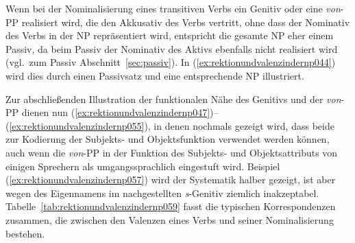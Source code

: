 Wenn bei der Nominalisierung eines transitiven Verbs ein Genitiv oder eine \textit{von}-PP realisiert wird, die den Akkusativ des Verbs vertritt, ohne dass der Nominativ des Verbs in der NP repräsentiert wird, entspricht die gesamte NP eher einem Passiv, da beim Passiv der Nominativ des Aktivs ebenfalls nicht realisiert wird (vgl.\ zum Passiv Abschnitt~\ref{sec:passiv}).
In (\ref{ex:rektionundvalenzindernp044}) wird dies durch einen Passivsatz und eine entsprechende NP illustriert.

\begin{exe}
  \ex\label{ex:rektionundvalenzindernp044}
  \begin{xlist}
  \end{xlist}
\end{exe}

Zur abschließenden Illustration der funktionalen Nähe des Genitivs und der \textit{von}-PP dienen nun (\ref{ex:rektionundvalenzindernp047})--(\ref{ex:rektionundvalenzindernp055}), in denen nochmals gezeigt wird, dass beide zur Kodierung der Subjekts- und Objektsfunktion verwendet werden können, auch wenn die \textit{von}-PP in der Funktion des Subjekts- und Objektsattributs von einigen Sprechern als umgangssprachlich eingestuft wird.
Beispiel (\ref{ex:rektionundvalenzindernp057}) wird der Systematik halber gezeigt, ist aber wegen des Eigennamens im nachgestellten \textit{s}-Genitiv ziemlich inakzeptabel.
Tabelle~\ref{tab:rektionundvalenzindernp059} fasst die typischen Korrespondenzen zusammen, die zwischen den Valenzen eines Verbs und seiner Nominalisierung bestehen.

\begin{exe}
  \ex\label{ex:rektionundvalenzindernp047}
  \begin{xlist}
  \end{xlist}
  \ex\label{ex:rektionundvalenzindernp051}
  \begin{xlist}
  \end{xlist}
  \ex\label{ex:rektionundvalenzindernp055}
  \begin{xlist}
  \end{xlist}
\end{exe}

